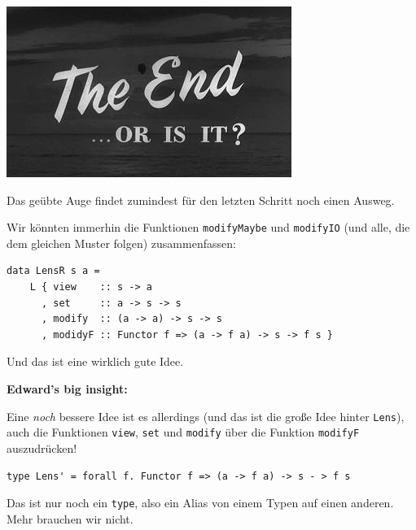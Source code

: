 \documentclass{beamer}
\begin{document}

\begin{frame}

\begin{center}
\includegraphics[scale=1]{the-end-or-is-it.jpg} 
\end{center}

\end{frame}


\begin{frame}[fragile]
Das geübte Auge findet zumindest für den letzten Schritt noch einen Ausweg.
\pause

Wir könnten immerhin die Funktionen \texttt{modifyMaybe} und \texttt{modifyIO} (und alle, die dem gleichen Muster folgen) zusammenfassen:

\begin{verbatim}
data LensR s a =
    L { view    :: s -> a
      , set     :: a -> s -> s 
      , modify  :: (a -> a) -> s -> s 
      , modidyF :: Functor f => (a -> f a) -> s -> f s }
\end{verbatim}

Und das ist eine wirklich gute Idee. 

\end{frame}


\begin{frame}[fragile]

\textbf{Edward's big insight:}
\pause
\smallskip

Eine \emph{noch} bessere Idee ist es allerdings (und das ist die große Idee hinter \texttt{Lens}), auch die Funktionen \texttt{view}, \texttt{set} und \texttt{modify} über die Funktion \texttt{modifyF} auszudrücken!
\pause
\smallskip\smallskip

\begin{verbatim}
type Lens' = forall f. Functor f => (a -> f a) -> s - > f s
\end{verbatim}
\pause
\smallskip\smallskip

Das ist nur noch ein \texttt{type}, also ein Alias von einem Typen auf einen anderen. Mehr brauchen wir nicht.

\end{frame}
\end{document}
